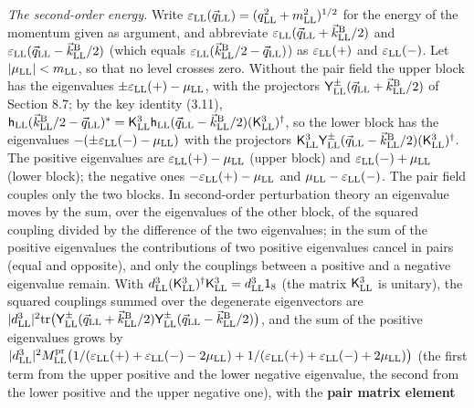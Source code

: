 \documentclass[
  10pt,
]{article}
\begin{document}
\emph{The second-order energy.} Write
\(\varepsilon_{\rm LL}(\vec q_{\rm LL})=(q_{\rm LL}^2+m_{\rm LL}^2)^{1/2}\)
for the energy of the momentum given as argument, and abbreviate
\(\varepsilon_{\rm LL}(\vec q_{\rm LL}+\vec k^{\rm B}_{\rm LL}/2)\) and
\(\varepsilon_{\rm LL}(\vec q_{\rm LL}-\vec k^{\rm B}_{\rm LL}/2)\)
(which equals
\(\varepsilon_{\rm LL}(\vec k^{\rm B}_{\rm LL}/2-\vec q_{\rm LL})\)) as
\(\varepsilon_{\rm LL}(+)\) and \(\varepsilon_{\rm LL}(-)\). Let
\(\lvert\mu_{\rm LL}\rvert<m_{\rm LL}\), so that no level crosses zero.
Without the pair field the upper block has the eigenvalues
\(\pm\varepsilon_{\rm LL}(+)-\mu_{\rm LL}\), with the projectors
\(\mathsf Y^\pm_{\rm LL}(\vec q_{\rm LL}+\vec k^{\rm B}_{\rm LL}/2)\) of
Section 8.7; by the key identity (3.11),
\(\mathsf h_{\rm LL}(\vec k^{\rm B}_{\rm LL}/2-\vec q_{\rm LL})^*=\mathsf K^3_{\rm LL}\mathsf h_{\rm LL}(\vec q_{\rm LL}-\vec k^{\rm B}_{\rm LL}/2)(\mathsf K^3_{\rm LL})^\dagger\),
so the lower block has the eigenvalues
\(-(\pm\varepsilon_{\rm LL}(-)-\mu_{\rm LL})\) with the projectors
\(\mathsf K^3_{\rm LL}\mathsf Y^\pm_{\rm LL}(\vec q_{\rm LL}-\vec k^{\rm B}_{\rm LL}/2)(\mathsf K^3_{\rm LL})^\dagger\).
The positive eigenvalues are \(\varepsilon_{\rm LL}(+)-\mu_{\rm LL}\)
(upper block) and \(\varepsilon_{\rm LL}(-)+\mu_{\rm LL}\) (lower
block); the negative ones \(-\varepsilon_{\rm LL}(+)-\mu_{\rm LL}\) and
\(\mu_{\rm LL}-\varepsilon_{\rm LL}(-)\). The pair field couples only
the two blocks. In second-order perturbation theory an eigenvalue moves
by the sum, over the eigenvalues of the other block, of the squared
coupling divided by the difference of the two eigenvalues; in the sum of
the positive eigenvalues the contributions of two positive eigenvalues
cancel in pairs (equal and opposite), and only the couplings between a
positive and a negative eigenvalue remain. With
\(d^3_{\rm LL}(\mathsf K^3_{\rm LL})^\dagger\mathsf K^3_{\rm LL}=d^3_{\rm LL}\mathsf 1_8\)
(the matrix \(\mathsf K^3_{\rm LL}\) is unitary), the squared couplings
summed over the degenerate eigenvectors are
\(\lvert d^3_{\rm LL}\rvert^2{\rm tr}\big(\mathsf Y^\pm_{\rm LL}(\vec q_{\rm LL}+\vec k^{\rm B}_{\rm LL}/2)\mathsf Y^\pm_{\rm LL}(\vec q_{\rm LL}-\vec k^{\rm B}_{\rm LL}/2)\big)\),
and the sum of the positive eigenvalues grows by
\(\lvert d^3_{\rm LL}\rvert^2M^{\rm pr}_{\rm LL}\big(1/(\varepsilon_{\rm LL}(+)+\varepsilon_{\rm LL}(-)-2\mu_{\rm LL})+1/(\varepsilon_{\rm LL}(+)+\varepsilon_{\rm LL}(-)+2\mu_{\rm LL})\big)\)
(the first term from the upper positive and the lower negative
eigenvalue, the second from the lower positive and the upper negative
one), with the \textbf{pair matrix element}
\end{document}
